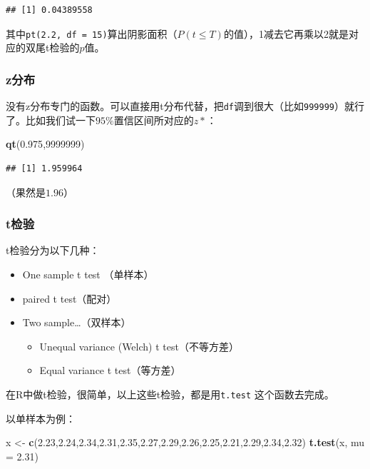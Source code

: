 \documentclass[]{book}
\newenvironment{Shaded}{\begin{snugshade}}{\end{snugshade}}
\newcommand{\DataTypeTok}[1]{\textcolor[rgb]{0.13,0.29,0.53}{#1}}
\newcommand{\DecValTok}[1]{\textcolor[rgb]{0.00,0.00,0.81}{#1}}
\newcommand{\FloatTok}[1]{\textcolor[rgb]{0.00,0.00,0.81}{#1}}
\newcommand{\KeywordTok}[1]{\textcolor[rgb]{0.13,0.29,0.53}{\textbf{#1}}}
\newcommand{\NormalTok}[1]{#1}
\newcommand{\StringTok}[1]{\textcolor[rgb]{0.31,0.60,0.02}{#1}}
\providecommand{\tightlist}{%
  \setlength{\itemsep}{0pt}\setlength{\parskip}{0pt}}
\begin{document}
\begin{verbatim}
## [1] 0.04389558
\end{verbatim}

其中\texttt{pt(2.2,\ df\ =\ 15)}算出阴影面积（\(P(t≤T)\)的值），1减去它再乘以2就是对应的双尾t检验的\(p\)值。

\hypertarget{z}{%
\subsubsection{z分布}\label{z}}

没有z分布专门的函数。可以直接用t分布代替，把\texttt{df}调到很大（比如\texttt{999999}）就行了。比如我们试一下\(95\%\)置信区间所对应的\(z*\)：

\begin{Shaded}
\begin{Highlighting}[]
\KeywordTok{qt}\NormalTok{(}\FloatTok{0.975}\NormalTok{,}\DecValTok{9999999}\NormalTok{)}
\end{Highlighting}
\end{Shaded}

\begin{verbatim}
## [1] 1.959964
\end{verbatim}

（果然是\(1.96\)）

\hypertarget{t}{%
\subsubsection{t检验}\label{t}}

t检验分为以下几种：

\begin{itemize}
\tightlist
\item
  One sample t test （单样本）
\item
  paired t test（配对）
\item
  Two sample\ldots{}（双样本）

  \begin{itemize}
  \tightlist
  \item
    Unequal variance (Welch) t test（不等方差）
  \item
    Equal variance t test（等方差）
  \end{itemize}
\end{itemize}

在R中做t检验，很简单，以上这些t检验，都是用\texttt{t.test} 这个函数去完成。

以单样本为例：

\begin{Shaded}
\begin{Highlighting}[]
\NormalTok{x <-}\StringTok{ }\KeywordTok{c}\NormalTok{(}\FloatTok{2.23}\NormalTok{,}\FloatTok{2.24}\NormalTok{,}\FloatTok{2.34}\NormalTok{,}\FloatTok{2.31}\NormalTok{,}\FloatTok{2.35}\NormalTok{,}\FloatTok{2.27}\NormalTok{,}\FloatTok{2.29}\NormalTok{,}\FloatTok{2.26}\NormalTok{,}\FloatTok{2.25}\NormalTok{,}\FloatTok{2.21}\NormalTok{,}\FloatTok{2.29}\NormalTok{,}\FloatTok{2.34}\NormalTok{,}\FloatTok{2.32}\NormalTok{)}
\KeywordTok{t.test}\NormalTok{(x, }\DataTypeTok{mu =} \FloatTok{2.31}\NormalTok{)}
\end{Highlighting}
\end{Shaded}
\end{document}

